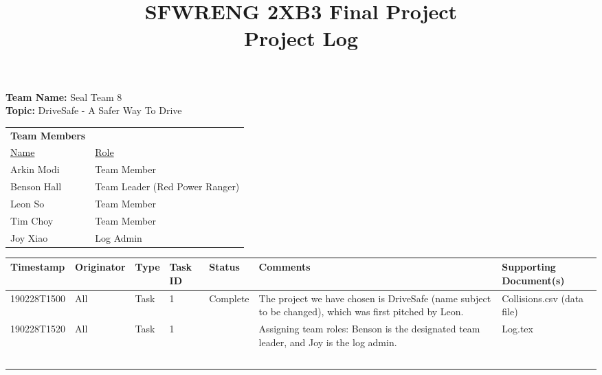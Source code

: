 \documentclass[12pt]{article}
\title{SFWRENG 2XB3 Final Project \\
        \large Project Log
        \vspace{-4ex}}
\date{}
\begin{document}
    \maketitle

    \textbf{ Team Name:} Seal Team 8 \\
    \indent \textbf{ Topic:} DriveSafe - A Safer Way To Drive \\

    \begin{tabular}{ll}
        \textbf{Team Members} & ~ \\
        \underline{Name} & \underline{Role} \\
        Arkin Modi  & Team Member\\
        Benson Hall & Team Leader (Red Power Ranger) \\
        Leon So     & Team Member\\
        Tim Choy    & Team Member \\
        Joy Xiao    & Log Admin \\
    \end{tabular}
    \newline
    \vspace{1cm}
    \newline
    \begin{tabular}{| l | l | l | P{1cm} | l | P{3cm} | P{3cm} |}
        \hline
        \textbf{Timestamp} & \textbf{Originator} & \textbf{Type} 
        & \textbf{Task ID} & \textbf{Status} & \textbf{Comments} 
        & \textbf{Supporting Document(s)}\\
        \hline
        190228T1500 & All & Task & 1 & Complete & The project we have chosen is 
        DriveSafe (name subject to be changed), which was first pitched by 
        Leon. & Collisions.csv (data file)\\
        \hline
        190228T1520 & All & Task & 1 & ~ & Assigning team roles: Benson is the 
        designated team leader, and Joy is the log admin. & Log.tex\\
        \hline
        ~ & ~ & ~ & ~ & ~ & ~ & ~\\
        \hline
    \end{tabular}
    
\end{document}
